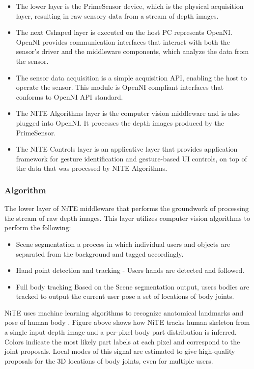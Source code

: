 \begin{itemize}
\item The lower layer is the PrimeSensor device, which is the physical acquisition layer, resulting in raw sensory data from a stream of depth images. 
\item The next Cshaped layer is executed on the host PC represents OpenNI. OpenNI provides communication interfaces that interact with both the sensor's driver and the middleware components, which analyze the data from the sensor. 
\item The sensor data acquisition is a simple acquisition API, enabling the host to operate the sensor. This module is OpenNI compliant interfaces that conforms to OpenNI API standard.
\item The NITE Algorithms layer is the computer vision middleware and is also plugged into OpenNI. It processes the depth images produced by the PrimeSensor. 
\item The NITE Controls layer is an applicative layer that provides application framework for gesture identification and gesture-based UI controls, on top of the data that was processed by NITE Algorithms. 
\end{itemize}


\subsubsection{Algorithm}
The lower layer of NiTE middleware that performs the groundwork of processing the stream of raw depth images. This layer utilizes computer vision algorithms to perform the following:

\begin{itemize}
	\item Scene segmentation  a process in which individual users and objects are separated from the background and tagged accordingly.
	\item Hand point detection and tracking - Users hands are detected and followed.
	\item Full body tracking Based on the Scene segmentation output, users bodies are tracked to output the current user pose a set of locations of body joints.
\end{itemize}

NiTE uses machine learning algorithms to recognize anatomical landmarks and pose of human body \cite{}. Figure above shows how NiTE tracks human skeleton from a single input depth image and a per-pixel body part distribution is inferred. Colors indicate the most likely part labels at each pixel and correspond to the joint proposals. Local modes of this signal are estimated to give high-quality proposals for the 3D locations of body joints, even for multiple users.

